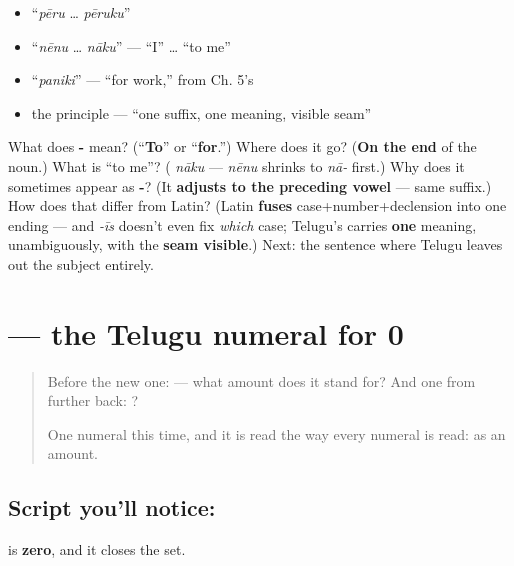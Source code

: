 \begin{itemize}
\raggedright
  \item \textquotedblleft{}\emph{pēru} … \emph{pēruku}\textquotedblright{}
  \item \textquotedblleft{}\emph{nēnu} … \emph{nāku}\textquotedblright{} — \textquotedblleft{}I\textquotedblright{} … \textquotedblleft{}to me\textquotedblright{}
  \item \textquotedblleft{}\emph{paniki}\textquotedblright{} — \textquotedblleft{}for work,\textquotedblright{} from Ch. 5's 
  \item the principle — \textquotedblleft{}one suffix, one meaning, visible seam\textquotedblright{}
\end{itemize}

\begin{tcolorbox}[breakable,colback=teal!4,colframe=teal!35!black,title={Before you move on}]
What does \textbf{-} mean? (\textquotedblleft{}\textbf{To}\textquotedblright{} or \textquotedblleft{}\textbf{for}.\textquotedblright{}) Where does it go? (\textbf{On the end} of the noun.) What is \textquotedblleft{}to me\textquotedblright{}? (\textbf{} \emph{nāku} — \emph{nēnu} shrinks to \emph{nā-} first.) Why does it sometimes appear as \textbf{-}? (It \textbf{adjusts to the preceding vowel} — same suffix.) How does that differ from Latin? (Latin \textbf{fuses} case+number+declension into one ending — and \emph{-īs} doesn't even fix \emph{which} case; Telugu's carries \textbf{one} meaning, unambiguously, with the \textbf{seam visible}.) Next: the sentence where Telugu leaves out the subject entirely.
\end{tcolorbox}
\section[\texorpdfstring{\te{౦} (0)}{౦ (0)}]{ — the Telugu numeral for 0}

\label{lesson:TE-S149-digit-0}



\begin{quote}
Before the new one:  — what amount does it stand for? And one from further back: ?

One numeral this time, and it is read the way every numeral is read: as an amount.
\end{quote}

\subsection*{Script you'll notice: }
\textbf{} is \textbf{zero}, and it closes the set.

